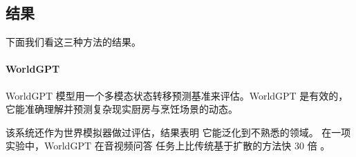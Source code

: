 \subsection{结果}
下面我们看这三种方法的结果。

\paragraph{WorldGPT} WorldGPT 模型用一个多模态状态转移预测基准来评估。WorldGPT 是有效的，它能准确理解并预测复杂现实厨房与烹饪场景的动态。

该系统还作为世界模拟器做过评估，结果表明%
它能泛化到不熟悉的领域。
在一项实验中，WorldGPT 在音视频问答
任务上比传统基于扩散的方法快 30 倍
\citep{ge2024worldgpt}。


